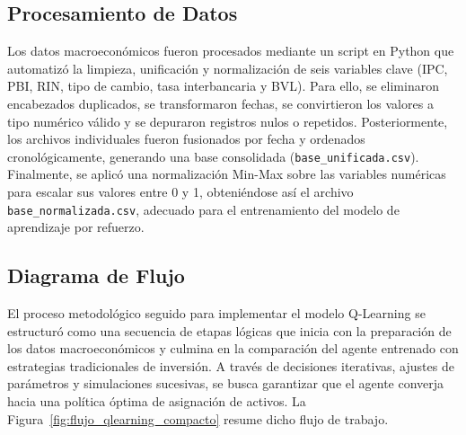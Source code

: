 \documentclass[conference]{IEEEtran}
\begin{document}
	\subsection{Procesamiento de Datos}
	
	Los datos macroeconómicos fueron procesados mediante un script en Python que automatizó la limpieza, unificación y normalización de seis variables clave (IPC, PBI, RIN, tipo de cambio, tasa interbancaria y BVL). Para ello, se eliminaron encabezados duplicados, se transformaron fechas, se convirtieron los valores a tipo numérico válido y se depuraron registros nulos o repetidos. Posteriormente, los archivos individuales fueron fusionados por fecha y ordenados cronológicamente, generando una base consolidada (\texttt{base\_unificada.csv}). Finalmente, se aplicó una normalización Min-Max sobre las variables numéricas para escalar sus valores entre 0 y 1, obteniéndose así el archivo \texttt{base\_normalizada.csv}, adecuado para el entrenamiento del modelo de aprendizaje por refuerzo.
	
	\subsection{Diagrama de Flujo}
	
	El proceso metodológico seguido para implementar el modelo Q-Learning se estructuró como una secuencia de etapas lógicas que inicia con la preparación de los datos macroeconómicos y culmina en la comparación del agente entrenado con estrategias tradicionales de inversión. A través de decisiones iterativas, ajustes de parámetros y simulaciones sucesivas, se busca garantizar que el agente converja hacia una política óptima de asignación de activos. La Figura~\ref{fig:flujo_qlearning_compacto} resume dicho flujo de trabajo.
	
\end{document}
